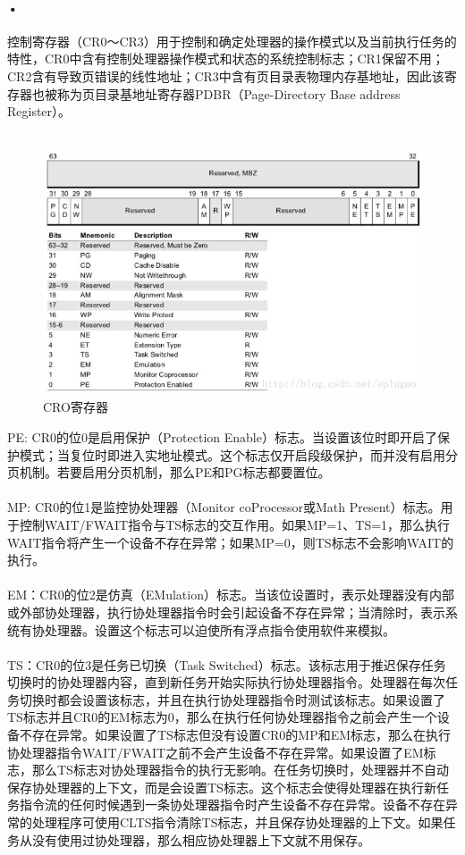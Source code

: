 \documentclass[12pt]{article}
\begin{document}
\paragraph{•}
控制寄存器（CR0～CR3）用于控制和确定处理器的操作模式以及当前执行任务的特性，CR0中含有控制处理器操作模式和状态的系统控制标志；CR1保留不用；CR2含有导致页错误的线性地址；CR3中含有页目录表物理内存基地址，因此该寄存器也被称为页目录基地址寄存器PDBR（Page-Directory Base address Register）。\\\\
\begin{figure}[htbp]
\centering
\includegraphics[scale=0.5]{fig/9.jpeg}
\caption{CRO寄存器}
\label{fig:CR0}
\end{figure}
PE: CR0的位0是启用保护（Protection Enable）标志。当设置该位时即开启了保护模式；当复位时即进入实地址模式。这个标志仅开启段级保护，而并没有启用分页机制。若要启用分页机制，那么PE和PG标志都要置位。\\\\
MP: CR0的位1是监控协处理器（Monitor coProcessor或Math Present）标志。用于控制WAIT/FWAIT指令与TS标志的交互作用。如果MP=1、TS=1，那么执行WAIT指令将产生一个设备不存在异常；如果MP=0，则TS标志不会影响WAIT的执行。\\\\
EM：CR0的位2是仿真（EMulation）标志。当该位设置时，表示处理器没有内部或外部协处理器，执行协处理器指令时会引起设备不存在异常；当清除时，表示系统有协处理器。设置这个标志可以迫使所有浮点指令使用软件来模拟。\\\\
TS：CR0的位3是任务已切换（Task Switched）标志。该标志用于推迟保存任务切换时的协处理器内容，直到新任务开始实际执行协处理器指令。处理器在每次任务切换时都会设置该标志，并且在执行协处理器指令时测试该标志。如果设置了TS标志并且CR0的EM标志为0，那么在执行任何协处理器指令之前会产生一个设备不存在异常。如果设置了TS标志但没有设置CR0的MP和EM标志，那么在执行协处理器指令WAIT/FWAIT之前不会产生设备不存在异常。如果设置了EM标志，那么TS标志对协处理器指令的执行无影响。在任务切换时，处理器并不自动保存协处理器的上下文，而是会设置TS标志。这个标志会使得处理器在执行新任务指令流的任何时候遇到一条协处理器指令时产生设备不存在异常。设备不存在异常的处理程序可使用CLTS指令清除TS标志，并且保存协处理器的上下文。如果任务从没有使用过协处理器，那么相应协处理器上下文就不用保存。\\\\
\end{document}
